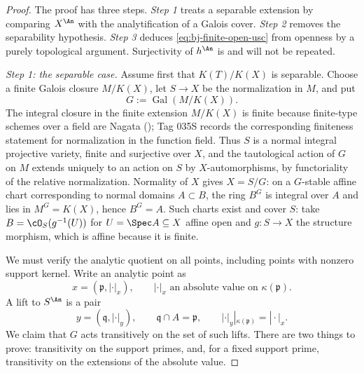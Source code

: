 \begin{proof}
The proof has three steps.  \emph{Step 1} treats a separable extension by
comparing $X^{\An}$ with the analytification of a Galois cover.
\emph{Step 2} removes the separability hypothesis.  \emph{Step 3} deduces
\eqref{eq:bj-finite-open-usc} from openness by a purely topological
argument.  Surjectivity of $h^{\An}$ is
 and will not be repeated.

\medskip
\noindent\emph{Step 1: the separable case.}
Assume first that $K(T)/K(X)$ is separable.  Choose a finite Galois
closure $M/K(X)$, let $S\to X$ be the normalization in $M$, and put
\[
                         G:=\operatorname{Gal}(M/K(X)).
\]
The integral closure in the finite extension $M/K(X)$ is finite
because finite-type schemes over a field are Nagata
(); Tag 035S records the corresponding
finiteness statement for normalization in the function field.
Thus $S$ is a normal integral projective variety, finite
and surjective over $X$, and the tautological action of $G$ on $M$
extends uniquely to an action on $S$ by $X$-automorphisms, by
functoriality of the relative normalization.
Normality of $X$ gives $X=S/G$: on a
$G$-stable affine chart corresponding to normal domains $A\subset B$,
the ring $B^G$ is integral over $A$ and lies in
$M^G=K(X)$, hence $B^G=A$.
Such charts exist and cover $S$: take $B=\cO_S(g^{-1}(U))$ for
$U=\Spec A\subseteq X$ affine open and $g:S\to X$ the structure
morphism, which is affine because it is finite.

We must verify the analytic quotient on all points, including points with
nonzero support kernel.  Write an analytic point as
\[
 x=(\mathfrak p,|\cdot|_x),\qquad
 |\cdot|_x\text{ an absolute value on }\kappa(\mathfrak p).
\tag{41.7}\label{eq:bj-analytic-point-pair}
\]
A lift to $S^{\An}$ is a pair
\[
 y=(\mathfrak q,|\cdot|_y),\qquad
 \mathfrak q\cap A=\mathfrak p,\qquad
 |\cdot|_y|_{\kappa(\mathfrak p)}=|\cdot|_x.
\tag{41.8}\label{eq:bj-analytic-lift-pair}
\]
We claim that $G$ acts transitively on the set of such lifts.  There are
two things to prove: transitivity on the support primes, and, for a fixed
support prime, transitivity on the extensions of the absolute value.


\end{proof}
